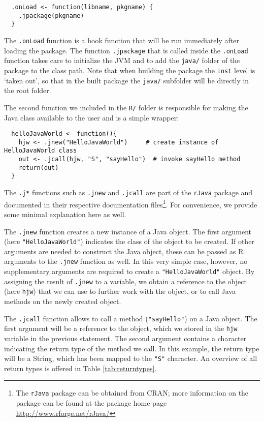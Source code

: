 \documentclass[a4paper, 11pt]{article}
\begin{document}
\begin{verbatim}
  .onLoad <- function(libname, pkgname) {
    .jpackage(pkgname)
  }
\end{verbatim}

The \texttt{.onLoad} function is a hook function that
will be run immediately after loading the package.
The function \texttt{.jpackage} that is called inside
the \texttt{.onLoad} function takes care to initialize the JVM
and to add the \texttt{java/} folder of the package to the class path.
Note that when building the package the \verb|inst| level is `taken out', 
so that in the built package the \verb|java/| subfolder will be directly
in the root folder.

The second function we included in the \texttt{R/} folder is responsible
for making the Java class available to the user and is a simple 
wrapper:

\begin{verbatim}
  helloJavaWorld <- function(){
    hjw <- .jnew("HelloJavaWorld")     # create instance of HelloJavaWorld class
    out <- .jcall(hjw, "S", "sayHello")  # invoke sayHello method
    return(out)
  }
\end{verbatim}

The \texttt{.j*} functions such as \texttt{.jnew} and \texttt{.jcall}
are part of the \texttt{rJava} package and documented in their respective
documentation files\footnote{The \texttt{rJava} package can be obtained from 
CRAN; more information on the package can be found at the package home page 
\url{http://www.rforge.net/rJava/}}. For convenience, we provide some minimal
explanation here as well. 

The \texttt{.jnew} function creates a new instance
of a Java object. The first argument (here \texttt{"HelloJavaWorld"}) 
indicates the class of the object to be created. If other arguments are needed 
to construct the Java object, these can be passed as R arguments to the \texttt{.jnew} 
function as well. In this very simple case, however, no supplementary arguments are required 
to create a \texttt{"HelloJavaWorld"} object. By assigning the result of \texttt{.jnew} to
a variable, we obtain a reference to the object (here \texttt{hjw}) that we can use to
further work with the object, or to call Java methods on the newly created object.

The \texttt{.jcall} function allows to call a method (\texttt{"sayHello"}) on a Java object.
The first argument will be a reference to the object, which we stored in the \texttt{hjw} variable
in the previous statement. The second argument contains a character indicating the return type
of the method we call. In this example, the return type will be a String, which has been mapped
to the \texttt{"S"} character. An overview of all return types is offered in Table 
\ref{tab:returntypes}. 
\end{document}
